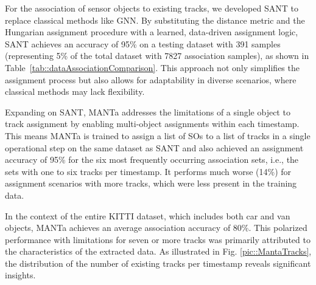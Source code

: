 \documentclass[letterpaper, 10 pt, journal, twoside]{IEEEtran}
\begin{document}
For the association of sensor objects to existing tracks, we developed \ac{SANT} to replace classical methods like \ac{GNN}. By substituting the distance metric and the Hungarian assignment procedure with a learned, data-driven assignment logic, \ac{SANT} achieves an accuracy of 95\% on a testing dataset with 391 samples (representing 5\% of the total dataset with 7827 association samples), as shown in Table~\ref{tab::dataAssociationComparison}. This approach not only simplifies the assignment process but also allows for adaptability in diverse scenarios, where classical methods may lack flexibility.

\begin{table}[b]
    \centering
    \caption{Data association results for the SANT and MANTa networks. MANTa's average accuracy is 80\%.}
    \label{tab::dataAssociationComparison}
\end{table}

Expanding on \ac{SANT}, \ac{MANTa} addresses the limitations of a single object to track assignment by enabling multi-object assignments within each timestamp.
This means \ac{MANTa} is trained to assign a list of \acp{SO} to a list of tracks in a single operational step on the same dataset as \ac{SANT} and also achieved an assignment accuracy of 95\% for the six most frequently occurring association sets, i.e., the sets with one to six tracks per timestamp. It performs much worse (14\%) for assignment scenarios with more tracks, which were less present in the training data.

In the context of the entire KITTI dataset, which includes both car and van objects,
MANTa achieves an average association accuracy of 80\%.
This polarized performance with limitations for seven or more tracks was primarily attributed to the characteristics of the extracted data.
As illustrated in Fig. {\ref{pic::MantaTracks}}, the distribution of the number of existing tracks per timestamp reveals significant insights.
\end{document}
